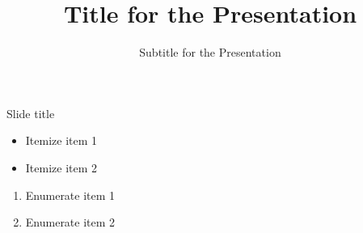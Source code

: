 \documentclass[aspectratio=169]{beamer}
\title{Title for the Presentation}
\subtitle{Subtitle for the Presentation}
\begin{document}
\frame{\maketitle}

\begin{frame}{Slide title}
    \begin{itemize}
        \item Itemize item 1
        \item Itemize item 2
    \end{itemize}
    \begin{enumerate}
        \item Enumerate item 1
        \item Enumerate item 2
    \end{enumerate}
\end{frame}
\end{document}
